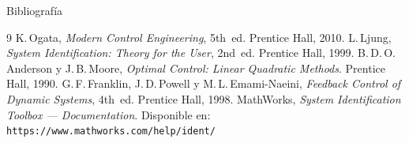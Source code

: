 \documentclass[mathserif,spanish,10pt]{beamer}
\begin{document}
\begin{frame}[allowframebreaks]{Bibliografía}
  \footnotesize
  \begin{thebibliography}{9}
      K.\,Ogata,
      \emph{Modern Control Engineering}, 5th~ed.
      Prentice Hall, 2010.
      L.\,Ljung,
      \emph{System Identification: Theory for the User}, 2nd~ed.
      Prentice Hall, 1999.
      B.\,D.\,O.\,Anderson y J.\,B.\,Moore,
      \emph{Optimal Control: Linear Quadratic Methods}.
      Prentice Hall, 1990.
      G.\,F.\,Franklin, J.\,D.\,Powell y M.\,L.\,Emami-Naeini,
      \emph{Feedback Control of Dynamic Systems}, 4th~ed.
      Prentice Hall, 1998.
      MathWorks,
      \emph{System Identification Toolbox — Documentation}.
      Disponible en: \texttt{https://www.mathworks.com/help/ident/}
  \end{thebibliography}
\end{frame}
\end{document}
